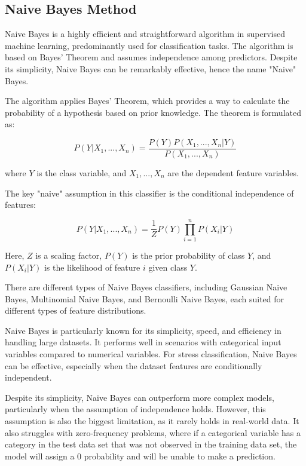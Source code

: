 \subsection*{Naive Bayes Method}

Naive Bayes is a highly efficient and straightforward algorithm in supervised machine learning, predominantly used for classification tasks. The algorithm is based on Bayes' Theorem and assumes independence among predictors. Despite its simplicity, Naive Bayes can be remarkably effective, hence the name "Naive" Bayes.

The algorithm applies Bayes' Theorem, which provides a way to calculate the probability of a hypothesis based on prior knowledge. The theorem is formulated as:

\[ P(Y|X_1, ..., X_n) = \frac{P(Y) P(X_1, ..., X_n|Y)}{P(X_1, ..., X_n)} \]

where \( Y \) is the class variable, and \( X_1, ..., X_n \) are the dependent feature variables.

The key "naive" assumption in this classifier is the conditional independence of features:

\[ P(Y|X_1, ..., X_n) = \frac{1}{Z} P(Y) \prod_{i=1}^{n} P(X_i|Y) \]

Here, \( Z \) is a scaling factor, \( P(Y) \) is the prior probability of class \( Y \), and \( P(X_i|Y) \) is the likelihood of feature \( i \) given class \( Y \).

There are different types of Naive Bayes classifiers, including Gaussian Naive Bayes, Multinomial Naive Bayes, and Bernoulli Naive Bayes, each suited for different types of feature distributions.

Naive Bayes is particularly known for its simplicity, speed, and efficiency in handling large datasets. It performs well in scenarios with categorical input variables compared to numerical variables. For stress classification, Naive Bayes can be effective, especially when the dataset features are conditionally independent.

Despite its simplicity, Naive Bayes can outperform more complex models, particularly when the assumption of independence holds. However, this assumption is also the biggest limitation, as it rarely holds in real-world data. It also struggles with zero-frequency problems, where if a categorical variable has a category in the test data set that was not observed in the training data set, the model will assign a 0 probability and will be unable to make a prediction.

